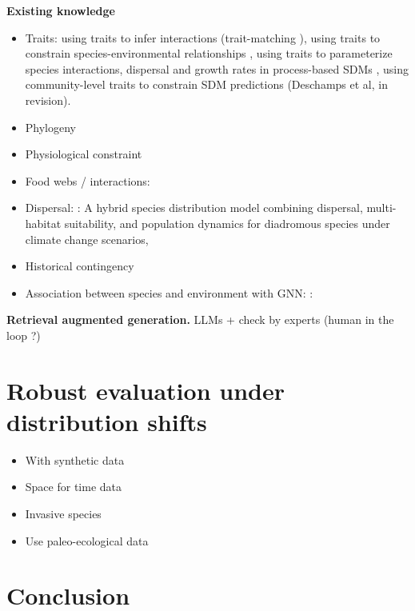 \noindent\textbf{Existing knowledge}
\begin{itemize}
    \item Traits: using traits to infer interactions (trait-matching \cite{pichler2020machine}), using traits to constrain species-environmental relationships \cite{pollock2012role}, using traits to parameterize species interactions, dispersal and growth rates in process-based SDMs \cite{chalmandrier2022predictions}, using community-level traits to constrain SDM predictions (Deschamps et al, in revision).  
    \item Phylogeny
    \item Physiological constraint
    \item Food webs / interactions: \cite{poggiato2025integrating}
    \item Dispersal: \cite{barber-omalley2022}: A hybrid species distribution model combining dispersal, multi-habitat suitability, and population dynamics for diadromous species under climate change scenarios, 
    \item Historical contingency
    \item Association between species and environment with GNN: \cite{harrell2025}: 
\end{itemize}

\noindent\textbf{Retrieval augmented generation.} LLMs + check by experts (human in the loop ?)


\section{Robust evaluation under distribution shifts}

\begin{itemize}
    \item With synthetic data
    \item Space for time data
    \item Invasive species
    \item Use paleo-ecological data
\end{itemize}


\section{Conclusion}


